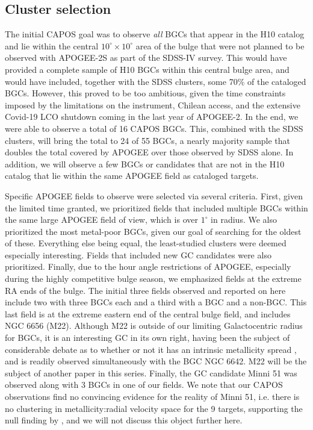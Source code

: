 \documentclass[onecolumn]{aa}
\begin{document}
\subsection{Cluster selection}


The initial CAPOS goal was to observe {\it all} BGCs that appear in the H10 catalog and lie within the central $10^\circ \times 10^\circ$  area of the bulge that were not planned to be observed with APOGEE-2S as part of the SDSS-IV survey. This would have provided a complete sample of H10 BGCs within this central bulge area, and would have included, together with the SDSS clusters, some 70\% of the cataloged BGCs. However, this proved to be too ambitious, given the time constraints imposed by the limitations on the instrument,  Chilean access, and the  extensive Covid-19 LCO shutdown coming in the last year of APOGEE-2. In the end, we were able to observe a total of 16 CAPOS BGCs. This, combined with the SDSS clusters, will bring the total to 24 of 55 BGCs,  a nearly majority sample that doubles the total covered by APOGEE over those observed by SDSS alone. In addition, we will observe a few BGCs or candidates that are not in the H10 catalog that lie within the same APOGEE field as cataloged targets.

Specific APOGEE fields to observe were selected via several criteria. First, given the limited time granted, we prioritized fields that included multiple BGCs within the same large APOGEE field of view, which is over $1^\circ$ in radius. We also prioritized the most metal-poor BGCs, given our goal of searching for the oldest of these. Everything else being equal, the least-studied clusters were deemed especially interesting. Fields that included new GC candidates \citep{Minniti2017a, Minniti2017b, Barba2019, Palma2019} were also prioritized. Finally, due to the hour angle restrictions of APOGEE,
especially during the highly competitive bulge season, we emphasized fields at the extreme RA ends of the bulge. The initial three fields observed and reported on here include two with three BGCs each and a third with a BGC and a non-BGC. This last field is at the extreme eastern end of the central bulge field, and includes NGC 6656 (M22). Although M22 is outside of our limiting Galactocentric radius for BGCs, it is an interesting GC in its own right, having been the subject of considerable debate as to whether or not it has an intrinsic metallicity spread \citep[e.g.,][]{Norris1983, Mucciarelli2015}, and is readily observed simultaneously with the BGC NGC 6642. M22 will be the subject of another paper in this series.
Finally, the GC candidate Minni 51 \citep{Minniti2017a} was observed along with 3 BGCs in one of our fields.  We note that our CAPOS observations find no convincing evidence for the reality of Minni 51, i.e. there is no clustering in metallicity:radial velocity space for the 9 targets, supporting the null finding by \citet{Gran2019}, and we will not discuss this object further here.
\end{document}
